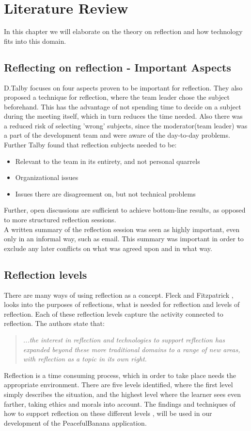 \section{Literature Review}
\label{sec:literaturereview}
In this chapter we will elaborate on the theory on reflection and how technology fits into this domain. 

\subsection{Reflecting on reflection - Important Aspects}
D.Talby \citep{Talby2006} focuses on four aspects proven to be important for reflection. They also proposed a technique for reflection, where the team leader chose the subject beforehand. This has the advantage of not spending time to decide on a subject during the meeting itself, which in turn reduces the time needed. Also there was a reduced risk of selecting 'wrong' subjects, since the moderator(team leader) was a part of the development team and were aware of the day-to-day problems.\\
Further Talby found that reflection subjects needed to be:
\begin{itemize}
\item Relevant to the team in its entirety, and not personal quarrels
\item Organizational issues
\item Issues there are disagreement on, but not technical problems
\end{itemize}
Further, open discussions are sufficient to achieve bottom-line results, as opposed to more structured reflection sessions.\\
A written summary of the reflection session was seen as highly important, even only in an informal way, such as email. This summary was important in order to exclude any later conflicts on what was agreed upon and in what way.
\subsection*{Reflection levels}
There are many ways of using reflection as a concept. Fleck and Fitzpatrick \citep{Fleck2010}, looks into the purposes of reflections, what is needed for reflection and levels of reflection. Each of these reflection levels capture the activity connected to reflection. The authors state that: 
\begin{quotation}
\emph{...the interest in reflection and technologies to support reflection has expanded beyond these more traditional domains to a range of new areas, with reflection as a topic in its own right. }
\end{quotation}
Reflection is a time consuming process, which in order to take place needs the appropriate environment. There are five levels identified, where the first level simply describes the situation, and the highest level where the learner sees even farther, taking ethics and morals into account. The findings and techniques of how to support reflection on these different levels \citep{Fleck2010}, will be used in our development of the PeacefulBanana application. 


